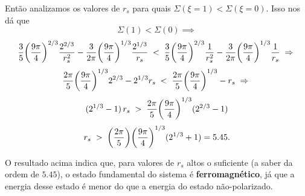 \documentclass[a4paper,10pt]{article}
\begin{document}
Então analizamos os valores de $r_s$ para quais $\Sigma(\xi = 1) < \Sigma(\xi = 0)$. Isso nos dá que
$$
\Sigma(1) < \Sigma(0) \implies
$$
$$
\frac{3}{5} \qty(\frac{9\pi}{4})^{2/3} \frac{2^{2/3}}{r_s^2}
- \frac{3}{2\pi} \qty(\frac{9\pi}{4})^{1/3} \frac{2^{1/3}}{r_s} \; < \;
\frac{3}{5} \qty(\frac{9\pi}{4})^{2/3} \frac{1}{r_s^2}
- \frac{3}{2\pi} \qty(\frac{9\pi}{4})^{1/3} \frac{1}{r_s} \; \Rightarrow \;
$$
$$
\frac{2\pi}{5} \qty(\frac{9\pi}{4})^{1/3} 2^{2/3} - 2^{1/3} r_s \; < \;
\frac{2\pi}{5} \qty(\frac{9\pi}{4})^{1/3} - r_s \; \Rightarrow \;
$$
$$
(2^{1/3} - 1) \, r_s \; > \; \frac{2\pi}{5} \qty(\frac{9\pi}{4})^{1/3} (2^{2/3} - 1)
$$
$$
r_s \; > \; \qty(\frac{2\pi}{5}) \qty(\frac{9\pi}{4})^{1/3} (2^{1/3} + 1) = 5.45.
$$

O resultado acima indica que, para valores de $r_s$ altos o suficiente (a saber da ordem de $5.45$), o estado fundamental do sistema é \textbf{ferromagnético}, já que a energia desse estado é menor do que a energia do estado não-polarizado.



\pagebreak
\end{document}
